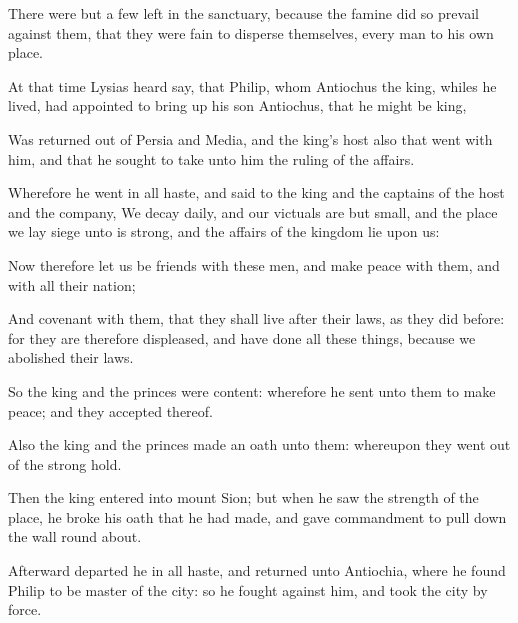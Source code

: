 {\par }{\PP {}There were but a few left in the sanctuary, because the famine did so prevail against them, that they were fain to disperse themselves, every man to his own place.
\par }{\PP {}At that time Lysias heard say, that Philip, whom Antiochus the king, whiles he lived, had appointed to bring up his son Antiochus, that he might be king,
\par }{\PP {}Was returned out of Persia and Media, and the king’s host also that went with him, and that he sought to take unto him the ruling of the affairs.
\par }{\PP {}Wherefore he went in all haste, and said to the king and the captains of the host and the company, We decay daily, and our victuals are but small, and the place we lay siege unto is strong, and the affairs of the kingdom lie upon us:
\par }{\PP {}Now therefore let us be friends with these men, and make peace with them, and with all their nation;
\par }{\PP {}And covenant with them, that they shall live after their laws, as they did before: for they are therefore displeased, and have done all these things, because we abolished their laws.
\par }{\PP {}So the king and the princes were content: wherefore he sent unto them to make peace; and they accepted thereof.
\par }{\PP {}Also the king and the princes made an oath unto them: whereupon they went out of the strong hold.
\par }{\PP {}Then the king entered into mount Sion; but when he saw the strength of the place, he broke his oath that he had made, and gave commandment to pull down the wall round about.
\par }{\PP {}Afterward departed he in all haste, and returned unto Antiochia, where he found Philip to be master of the city: so he fought against him, and took the city by force.

}

